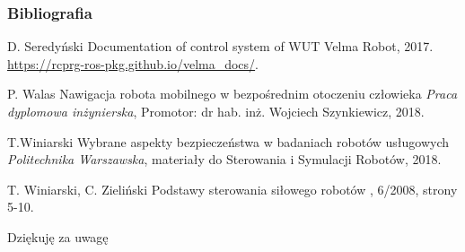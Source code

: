 
\begin{frame}[plain]
\addtocounter{framenumber}{-1}
\frametitle{Bibliografia}
\footnotesize{
\begin{thebibliography}{99} %
 D. Seredyński
\newblock Documentation of control system of WUT Velma Robot, 2017.
\newblock \url{https://rcprg-ros-pkg.github.io/velma\_docs/}.

 P. Walas
\newblock Nawigacja robota mobilnego w bezpośrednim otoczeniu człowieka
\newblock \emph{Praca dyplomowa inżynierska}, Promotor: dr hab. inż. Wojciech Szynkiewicz, 2018.

 T.Winiarski
\newblock Wybrane aspekty bezpieczeństwa w badaniach robotów usługowych
\newblock \emph{Politechnika Warszawska}, materiały do Sterowania i Symulacji Robotów, 2018.

 T. Winiarski, C. Zieliński
\newblock Podstawy sterowania siłowego robotów
, 6/2008, strony 5-10.

\end{thebibliography}
}
\end{frame}


\begin{frame}[plain]
\addtocounter{framenumber}{-1}
\Huge{\centerline{Dziękuję za uwagę}}
\end{frame}

